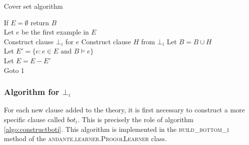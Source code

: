 \documentclass{article}
\begin{document}
\begin{algorithm}[H]
\label{algo:coverSet}
\caption{Cover set algorithm}
If $E = \emptyset$ return $B$ \\
Let $e$ be the first example in $E$ \\
Construct clause $\bot_i$ for $e$ 
Construct clause $H$ from $\bot_i$ 
Let $B = B \cup H$ \\
Let $E' = \{e: e \in E \text{ and } B \models e\}$ \\
Let $E = E-E'$ \\
Goto 1
\end{algorithm}

\subsubsection{Algorithm for $\bot_i$} \label{ilp:inductionalgo:bottomi}

For each new clause added to the theory, it is first necessary to construct a 
more specific clause called $bot_i$. This is precisely the role of algorithm
\ref{algo:constructboti}. This algorithm is implemented in the 
\textsc{build\_bottom\_i} method of the \textsc{andante.learner.ProgolLearner}
class.
\end{document}
